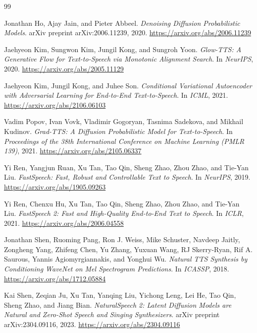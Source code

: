 \documentclass[11pt,a4paper]{article}
\begin{document}
\begin{thebibliography}{99}

Jonathan Ho, Ajay Jain, and Pieter Abbeel.
\newblock \emph{Denoising Diffusion Probabilistic Models}.
\newblock arXiv preprint arXiv:2006.11239, 2020.
\newblock \url{https://arxiv.org/abs/2006.11239}

Jaehyeon Kim, Sungwon Kim, Jungil Kong, and Sungroh Yoon.
\newblock \emph{Glow-TTS: A Generative Flow for Text-to-Speech via Monotonic Alignment Search}.
\newblock In \emph{NeurIPS}, 2020.
\newblock \url{https://arxiv.org/abs/2005.11129}

Jaehyeon Kim, Jungil Kong, and Juhee Son.
\newblock \emph{Conditional Variational Autoencoder with Adversarial Learning for End-to-End Text-to-Speech}.
\newblock In \emph{ICML}, 2021.
\newblock \url{https://arxiv.org/abs/2106.06103}

Vadim Popov, Ivan Vovk, Vladimir Gogoryan, Tasnima Sadekova, and Mikhail Kudinov.
\newblock \emph{Grad-TTS: A Diffusion Probabilistic Model for Text-to-Speech}.
\newblock In \emph{Proceedings of the 38th International Conference on Machine Learning (PMLR 139)}, 2021.
\newblock \url{https://arxiv.org/abs/2105.06337}

Yi Ren, Yangjun Ruan, Xu Tan, Tao Qin, Sheng Zhao, Zhou Zhao, and Tie-Yan Liu.
\newblock \emph{FastSpeech: Fast, Robust and Controllable Text to Speech}.
\newblock In \emph{NeurIPS}, 2019.
\newblock \url{https://arxiv.org/abs/1905.09263}

Yi Ren, Chenxu Hu, Xu Tan, Tao Qin, Sheng Zhao, Zhou Zhao, and Tie-Yan Liu.
\newblock \emph{FastSpeech 2: Fast and High-Quality End-to-End Text to Speech}.
\newblock In \emph{ICLR}, 2021.
\newblock \url{https://arxiv.org/abs/2006.04558}

Jonathan Shen, Ruoming Pang, Ron J. Weiss, Mike Schuster, Navdeep Jaitly, Zongheng Yang, Zhifeng Chen, Yu Zhang, Yuxuan Wang, RJ Skerry-Ryan, Rif A. Saurous, Yannis Agiomyrgiannakis, and Yonghui Wu.
\newblock \emph{Natural TTS Synthesis by Conditioning WaveNet on Mel Spectrogram Predictions}.
\newblock In \emph{ICASSP}, 2018.
\newblock \url{https://arxiv.org/abs/1712.05884}

Kai Shen, Zeqian Ju, Xu Tan, Yanqing Liu, Yichong Leng, Lei He, Tao Qin, Sheng Zhao, and Jiang Bian.
\newblock \emph{NaturalSpeech 2: Latent Diffusion Models are Natural and Zero-Shot Speech and Singing Synthesizers}.
\newblock arXiv preprint arXiv:2304.09116, 2023.
\newblock \url{https://arxiv.org/abs/2304.09116}


\end{thebibliography}
\end{document}
